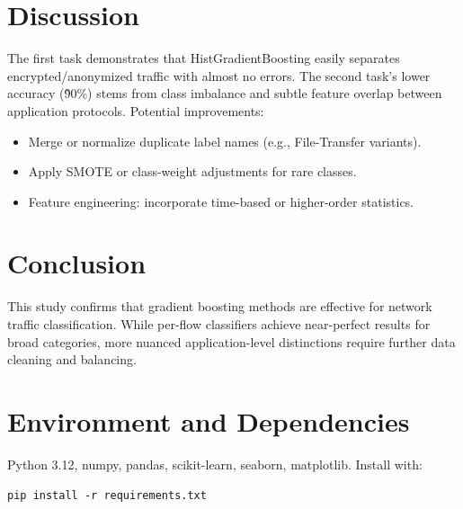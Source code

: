 \documentclass[12pt]{article}
\begin{document}
\section{Discussion}
The first task demonstrates that HistGradientBoosting easily separates encrypted/anonymized traffic with almost no errors. The second task's lower accuracy (\~90\%) stems from class imbalance and subtle feature overlap between application protocols. Potential improvements:
\begin{itemize}
  \item Merge or normalize duplicate label names (e.g., File-Transfer variants).
  \item Apply SMOTE or class-weight adjustments for rare classes.
  \item Feature engineering: incorporate time-based or higher-order statistics.
\end{itemize}

\section{Conclusion}
This study confirms that gradient boosting methods are effective for network traffic classification. While per-flow classifiers achieve near-perfect results for broad categories, more nuanced application-level distinctions require further data cleaning and balancing.

\appendix
\section{Environment and Dependencies}
Python 3.12, numpy, pandas, scikit-learn, seaborn, matplotlib. Install with:
\begin{verbatim}
pip install -r requirements.txt
\end{verbatim}
\end{document}
